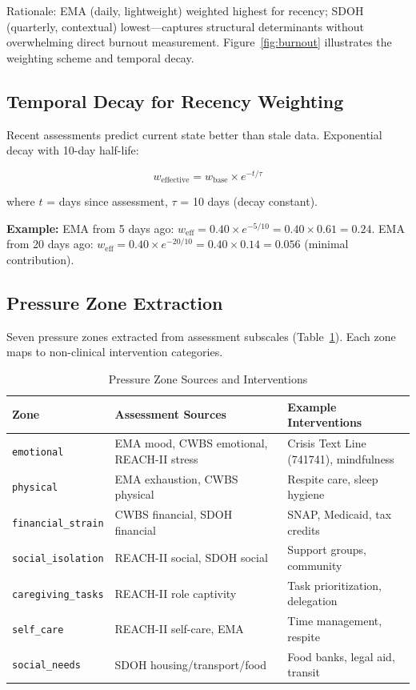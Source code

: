 \documentclass{article}%
\begin{document}
Rationale: EMA (daily, lightweight) weighted highest for recency; SDOH (quarterly, contextual) lowest—captures structural determinants without overwhelming direct burnout measurement. Figure~\ref{fig:burnout} illustrates the weighting scheme and temporal decay.

%
\subsection{Temporal Decay for Recency Weighting}%
\label{subsec:TemporalDecayforRecencyWeighting}%
Recent assessments predict current state better than stale data. Exponential decay with 10-day half-life:

$$w_{\text{effective}} = w_{\text{base}} \times e^{-t / \tau}$$

where $t$ = days since assessment, $\tau$ = 10 days (decay constant).

\textbf{Example:} EMA from 5 days ago: $w_{\text{eff}} = 0.40 \times e^{-5/10} = 0.40 \times 0.61 = 0.24$. EMA from 20 days ago: $w_{\text{eff}} = 0.40 \times e^{-20/10} = 0.40 \times 0.14 = 0.056$ (minimal contribution).

%
\subsection{Pressure Zone Extraction}%
\label{subsec:PressureZoneExtraction}%
Seven pressure zones extracted from assessment subscales (Table~\ref{table:pressure_zones}). Each zone maps to non-clinical intervention categories.

\begin{table}[h]
\centering
\caption{Pressure Zone Sources and Interventions}
\label{table:pressure_zones}
\small
\begin{tabular}{lp{4cm}p{5cm}}
\toprule
\textbf{Zone} & \textbf{Assessment Sources} & \textbf{Example Interventions} \\
\midrule
\texttt{emotional} & EMA mood, CWBS emotional, REACH-II stress & Crisis Text Line (741741), mindfulness \\
\texttt{physical} & EMA exhaustion, CWBS physical & Respite care, sleep hygiene \\
\texttt{financial\_strain} & CWBS financial, SDOH financial & SNAP, Medicaid, tax credits \\
\texttt{social\_isolation} & REACH-II social, SDOH social & Support groups, community \\
\texttt{caregiving\_tasks} & REACH-II role captivity & Task prioritization, delegation \\
\texttt{self\_care} & REACH-II self-care, EMA & Time management, respite \\
\texttt{social\_needs} & SDOH housing/transport/food & Food banks, legal aid, transit \\
\bottomrule
\end{tabular}
\end{table}
\end{document}
